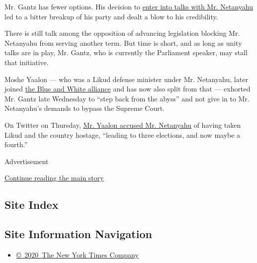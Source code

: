 Mr. Gantz has fewer options. His decision to
\href{https://www.nytimes3xbfgragh.onion/2020/03/26/world/middleeast/israel-netanyahu-gantz-government.html}{enter
into talks with Mr. Netanyahu} led to a bitter breakup of his party and
dealt a blow to his credibility.

There is still talk among the opposition of advancing legislation
blocking Mr. Netanyahu from serving another term. But time is short, and
as long as unity talks are in play, Mr. Gantz, who is currently the
Parliament speaker, may stall that initiative.

Moshe Yaalon --- who was a Likud defense minister under Mr. Netanyahu,
later joined
\href{https://www.nytimes3xbfgragh.onion/2019/03/22/world/middleeast/israel-generals-politics-netanyahu.html}{the
Blue and White alliance} and has now also split from that --- exhorted
Mr. Gantz late Wednesday to ``step back from the abyss'' and not give in
to Mr. Netanyahu's demands to bypass the Supreme Court.

On Twitter on Thursday,
\href{https://twitter.com/bogie_yaalon/status/1250639368261447680}{Mr.
Yaalon accused Mr. Netanyahu} of having taken Likud and the country
hostage, ``leading to three elections, and now maybe a fourth.''

Advertisement

\protect\hyperlink{after-bottom}{Continue reading the main story}

\hypertarget{site-index}{%
\subsection{Site Index}\label{site-index}}

\hypertarget{site-information-navigation}{%
\subsection{Site Information
Navigation}\label{site-information-navigation}}

\begin{itemize}
\tightlist
\item
  \href{https://help.nytimes3xbfgragh.onion/hc/en-us/articles/115014792127-Copyright-notice}{©~2020~The
  New York Times Company}
\end{itemize}

